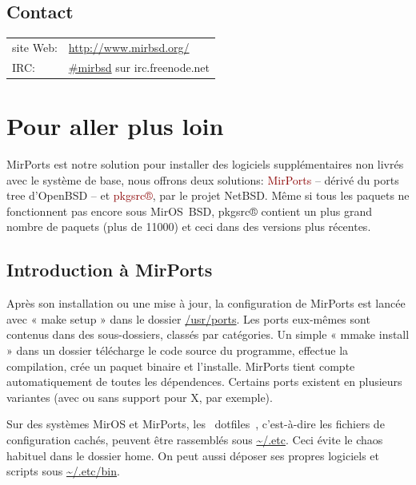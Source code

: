 \documentclass[a4paper,landscape,11pt,notumble]{leaflet}
\begin{document}
\subsection{Contact}
{\large
\begin{tabular}{ll}
site Web: & \textcolor{darkred}{\url{http://www.mirbsd.org/}}\\
IRC: & \textcolor{darkred}{\url{#mirbsd}} sur irc.freenode.net\\
\end{tabular}
\par}
\vspace{3ex}%
\graybox

\newpage

\section{Pour aller plus loin}

\noindent
MirPorts  est notre solution 
pour installer des logiciels supplémentaires non livrés avec le système de base, nous offrons deux solutions: \textcolor{darkred}{MirPorts} -- dérivé du ports tree d’OpenBSD -- et \textcolor{darkred}{pkgsrc®}, par le projet NetBSD.
Même si tous les paquets ne fonctionnent pas encore sous MirOS~BSD, pkgsrc® contient un plus grand nombre de paquets (plus de 11000) et ceci dans des versions plus récentes.

\subsection{Introduction à MirPorts}

Après son installation ou une mise à jour, la configuration de MirPorts est lancée avec « make setup » dans le dossier \url{/usr/ports}.
Les ports eux-mêmes sont contenus dans des sous-dossiers, classés par catégories.
Un simple « mmake install » dans un dossier télécharge le code source du programme, effectue la compilation, crée un paquet binaire et l’installe.
MirPorts tient compte automatiquement de toutes les dépendences.
Certains ports existent en plusieurs variantes (avec ou sans support pour X, par exemple).

Sur des systèmes MirOS et MirPorts, les \flqq~dotfiles~\frqq, c’est-à-dire les fichiers de configuration cachés, peuvent être rassemblés sous \url{~/.etc}. Ceci évite le chaos habituel dans le dossier home. On peut aussi déposer ses propres logiciels et scripts sous \url{~/.etc/bin}.
\end{document}
